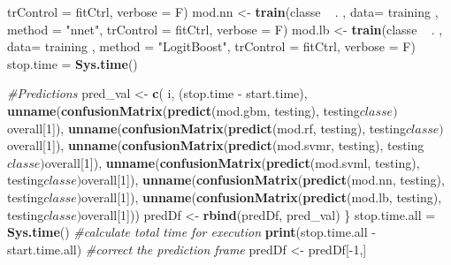 \documentclass[]{article}
\newenvironment{Shaded}{\begin{snugshade}}{\end{snugshade}}
\newcommand{\KeywordTok}[1]{\textcolor[rgb]{0.13,0.29,0.53}{\textbf{{#1}}}}
\newcommand{\DataTypeTok}[1]{\textcolor[rgb]{0.13,0.29,0.53}{{#1}}}
\newcommand{\DecValTok}[1]{\textcolor[rgb]{0.00,0.00,0.81}{{#1}}}
\newcommand{\StringTok}[1]{\textcolor[rgb]{0.31,0.60,0.02}{{#1}}}
\newcommand{\CommentTok}[1]{\textcolor[rgb]{0.56,0.35,0.01}{\textit{{#1}}}}
\newcommand{\NormalTok}[1]{{#1}}
\begin{document}
\begin{Shaded}
\begin{Highlighting}[]
                         \DataTypeTok{trControl =} \NormalTok{fitCtrl, }\DataTypeTok{verbose =} \NormalTok{F)}
        \NormalTok{mod.nn <-}\StringTok{ }\KeywordTok{train}\NormalTok{(classe ~}\StringTok{ }\NormalTok{. , }\DataTypeTok{data=} \NormalTok{training , }\DataTypeTok{method =} \StringTok{"nnet"}\NormalTok{, }
                        \DataTypeTok{trControl =} \NormalTok{fitCtrl, }\DataTypeTok{verbose =} \NormalTok{F)}
        \NormalTok{mod.lb <-}\StringTok{ }\KeywordTok{train}\NormalTok{(classe ~}\StringTok{ }\NormalTok{. , }\DataTypeTok{data=} \NormalTok{training , }\DataTypeTok{method =} \StringTok{"LogitBoost"}\NormalTok{, }
                        \DataTypeTok{trControl =} \NormalTok{fitCtrl, }\DataTypeTok{verbose =} \NormalTok{F)}
        \NormalTok{stop.time =}\StringTok{ }\KeywordTok{Sys.time}\NormalTok{()}
        
        \CommentTok{#Predictions}
        \NormalTok{pred_val <-}\StringTok{ }\KeywordTok{c}\NormalTok{( i, (stop.time -}\StringTok{ }\NormalTok{start.time),}
                        \KeywordTok{unname}\NormalTok{(}\KeywordTok{confusionMatrix}\NormalTok{(}\KeywordTok{predict}\NormalTok{(mod.gbm, testing), }
                                               \NormalTok{testing$classe)$overall[}\DecValTok{1}\NormalTok{]),}
                        \KeywordTok{unname}\NormalTok{(}\KeywordTok{confusionMatrix}\NormalTok{(}\KeywordTok{predict}\NormalTok{(mod.rf, testing), }
                                               \NormalTok{testing$classe)$overall[}\DecValTok{1}\NormalTok{]),}
                        \KeywordTok{unname}\NormalTok{(}\KeywordTok{confusionMatrix}\NormalTok{(}\KeywordTok{predict}\NormalTok{(mod.svmr, testing), }
                                               \NormalTok{testing$classe)$overall[}\DecValTok{1}\NormalTok{]),}
                        \KeywordTok{unname}\NormalTok{(}\KeywordTok{confusionMatrix}\NormalTok{(}\KeywordTok{predict}\NormalTok{(mod.svml, testing), }
                                               \NormalTok{testing$classe)$overall[}\DecValTok{1}\NormalTok{]),}
                        \KeywordTok{unname}\NormalTok{(}\KeywordTok{confusionMatrix}\NormalTok{(}\KeywordTok{predict}\NormalTok{(mod.nn, testing), }
                                               \NormalTok{testing$classe)$overall[}\DecValTok{1}\NormalTok{]),}
                        \KeywordTok{unname}\NormalTok{(}\KeywordTok{confusionMatrix}\NormalTok{(}\KeywordTok{predict}\NormalTok{(mod.lb, testing), }
                                               \NormalTok{testing$classe)$overall[}\DecValTok{1}\NormalTok{]))}
        \NormalTok{predDf <-}\StringTok{ }\KeywordTok{rbind}\NormalTok{(predDf, pred_val)}
\NormalTok{\}}
\NormalTok{stop.time.all =}\StringTok{ }\KeywordTok{Sys.time}\NormalTok{()}
\CommentTok{#calculate total time for execution}
\KeywordTok{print}\NormalTok{(stop.time.all -}\StringTok{ }\NormalTok{start.time.all)}
\CommentTok{#correct the prediction frame}
\NormalTok{predDf <-}\StringTok{ }\NormalTok{predDf[-}\DecValTok{1}\NormalTok{,]}
\end{Highlighting}
\end{Shaded}
\end{document}
